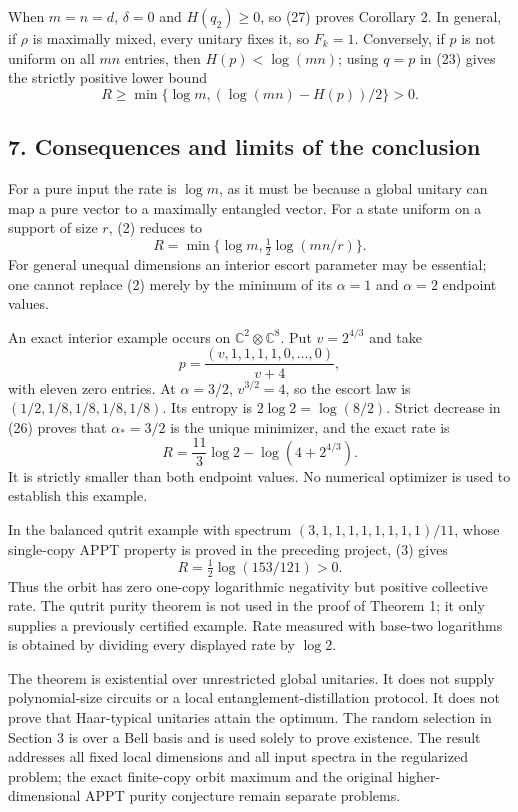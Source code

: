 \documentclass[11pt]{article}
\begin{document}
When \(m=n=d\), \(\delta=0\) and \(H(q_2)\ge0\), so (27) proves Corollary 2. In general, if \(\rho\) is maximally mixed, every unitary fixes it, so \(F_k=1\). Conversely, if \(p\) is not uniform on all \(mn\) entries, then \(H(p)<\log(mn)\); using \(q=p\) in (23) gives the strictly positive lower bound \[
 R\ge\min\{\log m,(\log(mn)-H(p))/2\}>0.
 \tag{30}
\]

\hypertarget{consequences-and-limits-of-the-conclusion}{%
\subsection{7. Consequences and limits of the conclusion}\label{consequences-and-limits-of-the-conclusion}}

For a pure input the rate is \(\log m\), as it must be because a global unitary can map a pure vector to a maximally entangled vector. For a state uniform on a support of size \(r\), (2) reduces to \[
 R=\min\{\log m,\tfrac12\log(mn/r)\}.
\] For general unequal dimensions an interior escort parameter may be essential; one cannot replace (2) merely by the minimum of its \(\alpha=1\) and \(\alpha=2\) endpoint values.

An exact interior example occurs on \(\mathbb C^2\otimes\mathbb C^8\). Put \(v=2^{4/3}\) and take \[
 p=\frac{(v,1,1,1,1,0,\ldots,0)}{v+4},
 \tag{31}
\] with eleven zero entries. At \(\alpha=3/2\), \(v^{3/2}=4\), so the escort law is \((1/2,1/8,1/8,1/8,1/8)\). Its entropy is \(2\log2=\log(8/2)\). Strict decrease in (26) proves that \(\alpha_*=3/2\) is the unique minimizer, and the exact rate is \[
 R=\frac{11}{3}\log2-\log(4+2^{4/3}).
 \tag{32}
\] It is strictly smaller than both endpoint values. No numerical optimizer is used to establish this example.

In the balanced qutrit example with spectrum \((3,1,1,1,1,1,1,1,1)/11\), whose single-copy APPT property is proved in the preceding project, (3) gives \[
 R=\tfrac12\log(153/121)>0.
\] Thus the orbit has zero one-copy logarithmic negativity but positive collective rate. The qutrit purity theorem is not used in the proof of Theorem 1; it only supplies a previously certified example. Rate measured with base-two logarithms is obtained by dividing every displayed rate by \(\log2\).

The theorem is existential over unrestricted global unitaries. It does not supply polynomial-size circuits or a local entanglement-distillation protocol. It does not prove that Haar-typical unitaries attain the optimum. The random selection in Section 3 is over a Bell basis and is used solely to prove existence. The result addresses all fixed local dimensions and all input spectra in the regularized problem; the exact finite-copy orbit maximum and the original higher-dimensional APPT purity conjecture remain separate problems.
\end{document}
